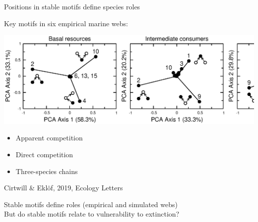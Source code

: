 \documentclass{beamer}
\begin{document}
  \begin{frame}{Positions in stable motifs define species roles}

    \begin{block}{Key motifs in six empirical marine webs:}

    \begin{centering}

      \includegraphics[width=\textwidth]{Eklof_figs/PCA_positions.eps}

    \end{centering}

    \begin{itemize}
      \item Apparent competition
      \item Direct competition
      \item Three-species chains
    \end{itemize}
    \end{block}
    \vspace{-0.5cm}
    {\tiny Cirtwill \& Ekl\"{o}f, 2019, Ecology Letters}

    {\color{DarkBlue}Stable motifs define roles (empirical and simulated webs)}\\
    {\color{white}But do stable motifs relate to vulnerability to extinction?}

    \end{frame}
\end{document}

